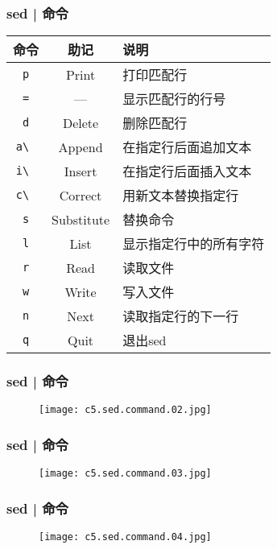 \begin{frame}[fragile]
  \frametitle{sed | \alert{命令}}
  \begin{table}
    \centering
    \begin{tabularx}{0.8\textwidth}{ccX}
      \hline
      \rowcolor{blue!50}命令 & 助记 & 说明\\
      \hline
      \verb|p| & Print & 打印匹配行\\
      \verb|=| & --- & 显示匹配行的行号\\
      \verb|d| & Delete & 删除匹配行\\
      \verb|a\ | & Append &  在指定行后面追加文本\\
      \verb|i\ | & Insert & 在指定行后面插入文本\\
      \verb|c\ | & Correct & 用新文本替换指定行\\
      \verb|s| & Substitute & 替换命令\\
      \verb|l| & List & 显示指定行中的所有字符\\
      \verb|r| & Read & 读取文件\\
      \verb|w| & Write & 写入文件\\
      \verb|n| & Next & 读取指定行的下一行\\
      \verb|q| & Quit & 退出sed\\
      \hline
    \end{tabularx}
  \end{table}
\end{frame}

\begin{frame}
  \frametitle{sed | 命令}
  \begin{figure}
    \centering
    \texttt{[image: c5.sed.command.02.jpg]}
  \end{figure}
\end{frame}

\begin{frame}
  \frametitle{sed | 命令}
  \begin{figure}
    \centering
    \texttt{[image: c5.sed.command.03.jpg]}
  \end{figure}
\end{frame}

\begin{frame}
  \frametitle{sed | 命令}
  \begin{figure}
    \centering
    \texttt{[image: c5.sed.command.04.jpg]}
  \end{figure}
\end{frame}

